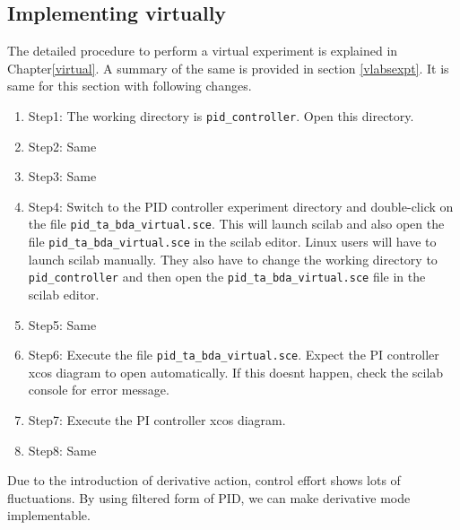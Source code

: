 \subsection{Implementing virtually}

The detailed procedure to perform a virtual experiment is explained in Chapter\ref{virtual}. A summary of the same is provided in section \ref{vlabsexpt}. It is same for this section with following changes.

\begin{enumerate}
\item Step1: The working directory is {\tt  pid\_controller}. Open this directory.
\item Step2: Same
\item Step3: Same
\item Step4:  Switch to the PID controller experiment directory and double-click on the file {\tt pid\_ta\_bda\_virtual.sce}. This will launch scilab and also open the file {\tt pid\_ta\_bda\_virtual.sce} in the scilab editor. Linux users will have to launch scilab manually. They also have to change the working directory to {\tt pid\_controller} and then open the {\tt  pid\_ta\_bda\_virtual.sce} file in the scilab editor.
\item Step5: Same
\item Step6: Execute the file {\tt pid\_ta\_bda\_virtual.sce}.  Expect the PI controller xcos diagram to open automatically. If this doesnt happen, check the scilab console for error message.
\item Step7: Execute the PI controller xcos diagram.
\item Step8: Same
\end{enumerate}

Due to the introduction of derivative action, control effort shows lots of fluctuations. By using filtered form of 
PID, we can make derivative mode implementable.


